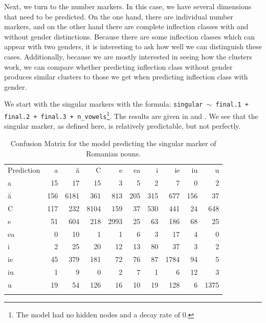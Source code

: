 Next, we turn to the number markers. In this case, we have several dimensions that need to be predicted. On the one hand, there are individual number markers, and on the other hand there are complete inflection classes with and without gender distinctions. Because there are some inflection classes which can appear with two genders, it is interesting to ask how well we can distinguish these cases.  Additionally, because we are mostly interested in seeing how the clusters work, we can compare whether predicting inflection class without gender produces similar clusters to those we get when predicting inflection class with gender.

We start with the singular markers with the formula: \texttt{singular $\sim$ final.1 + final.2 + final.3 + n\_vowels}\footnote{The model had no hidden nodes and a decay rate of 0.}. The results are given in  and . We see that the singular marker, as defined here, is relatively predictable, but not perfectly.

\begin{table}[!htpb]
  \centering
  \begin{tabular}{lrrrrrrrrr}
    \lsptoprule
    \multicolumn{10}{c}{Reference}                                         \\
    \midrule
    Prediction & a   & ă    & C    & e    & ea  & i   & ie   & iu  & u    \\
    a          & 15  & 17   & 15   & 3    & 5   & 2   & 7    & 0   & 2    \\
    ă          & 156 & 6181 & 361  & 813  & 205 & 315 & 677  & 156 & 37   \\
    C          & 117 & 232  & 8104 & 159  & 37  & 530 & 441  & 24  & 648  \\
    e          & 51  & 604  & 218  & 2993 & 25  & 63  & 186  & 68  & 25   \\
    ea         & 0   & 10   & 1    & 1    & 6   & 3   & 17   & 4   & 0    \\
    i          & 2   & 25   & 20   & 12   & 13  & 80  & 37   & 3   & 2    \\
    ie         & 45  & 379  & 181  & 72   & 76  & 87  & 1784 & 94  & 5    \\
    iu         & 1   & 9    & 0    & 2    & 7   & 1   & 6    & 12  & 3    \\
    u          & 19  & 54   & 126  & 16   & 10  & 19  & 128  & 6   & 1375 \\
    \lspbottomrule
  \end{tabular}
  \caption{Confusion Matrix for the model predicting the singular marker of Romanian nouns.}\label{tab:singular-romanian}
\end{table}

